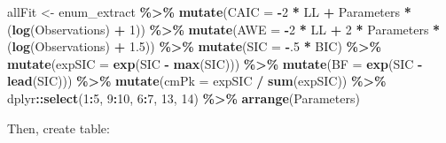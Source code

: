 \documentclass[
]{book}
\newenvironment{Shaded}{\begin{snugshade}}{\end{snugshade}}
\newcommand{\AttributeTok}[1]{\textcolor[rgb]{0.13,0.29,0.53}{#1}}
\newcommand{\DecValTok}[1]{\textcolor[rgb]{0.00,0.00,0.81}{#1}}
\newcommand{\FloatTok}[1]{\textcolor[rgb]{0.00,0.00,0.81}{#1}}
\newcommand{\FunctionTok}[1]{\textcolor[rgb]{0.13,0.29,0.53}{\textbf{#1}}}
\newcommand{\NormalTok}[1]{#1}
\newcommand{\OtherTok}[1]{\textcolor[rgb]{0.56,0.35,0.01}{#1}}
\newcommand{\SpecialCharTok}[1]{\textcolor[rgb]{0.81,0.36,0.00}{\textbf{#1}}}
\begin{document}
\begin{Shaded}
\begin{Highlighting}[]
\NormalTok{allFit }\OtherTok{\textless{}{-}}\NormalTok{ enum\_extract }\SpecialCharTok{\%\textgreater{}\%}
  \FunctionTok{mutate}\NormalTok{(}\AttributeTok{CAIC =} \SpecialCharTok{{-}}\DecValTok{2} \SpecialCharTok{*}\NormalTok{ LL }\SpecialCharTok{+}\NormalTok{ Parameters }\SpecialCharTok{*}\NormalTok{ (}\FunctionTok{log}\NormalTok{(Observations) }\SpecialCharTok{+} \DecValTok{1}\NormalTok{)) }\SpecialCharTok{\%\textgreater{}\%}
  \FunctionTok{mutate}\NormalTok{(}\AttributeTok{AWE =} \SpecialCharTok{{-}}\DecValTok{2} \SpecialCharTok{*}\NormalTok{ LL }\SpecialCharTok{+} \DecValTok{2} \SpecialCharTok{*}\NormalTok{ Parameters }\SpecialCharTok{*}\NormalTok{ (}\FunctionTok{log}\NormalTok{(Observations) }\SpecialCharTok{+} \FloatTok{1.5}\NormalTok{)) }\SpecialCharTok{\%\textgreater{}\%}
  \FunctionTok{mutate}\NormalTok{(}\AttributeTok{SIC =} \SpecialCharTok{{-}}\NormalTok{.}\DecValTok{5} \SpecialCharTok{*}\NormalTok{ BIC) }\SpecialCharTok{\%\textgreater{}\%}
  \FunctionTok{mutate}\NormalTok{(}\AttributeTok{expSIC =} \FunctionTok{exp}\NormalTok{(SIC }\SpecialCharTok{{-}} \FunctionTok{max}\NormalTok{(SIC))) }\SpecialCharTok{\%\textgreater{}\%}
  \FunctionTok{mutate}\NormalTok{(}\AttributeTok{BF =} \FunctionTok{exp}\NormalTok{(SIC }\SpecialCharTok{{-}} \FunctionTok{lead}\NormalTok{(SIC))) }\SpecialCharTok{\%\textgreater{}\%}
  \FunctionTok{mutate}\NormalTok{(}\AttributeTok{cmPk =}\NormalTok{ expSIC }\SpecialCharTok{/} \FunctionTok{sum}\NormalTok{(expSIC)) }\SpecialCharTok{\%\textgreater{}\%}
\NormalTok{  dplyr}\SpecialCharTok{::}\FunctionTok{select}\NormalTok{(}\DecValTok{1}\SpecialCharTok{:}\DecValTok{5}\NormalTok{, }\DecValTok{9}\SpecialCharTok{:}\DecValTok{10}\NormalTok{, }\DecValTok{6}\SpecialCharTok{:}\DecValTok{7}\NormalTok{, }\DecValTok{13}\NormalTok{, }\DecValTok{14}\NormalTok{) }\SpecialCharTok{\%\textgreater{}\%}
  \FunctionTok{arrange}\NormalTok{(Parameters)}
\end{Highlighting}
\end{Shaded}

Then, create table:
\end{document}
